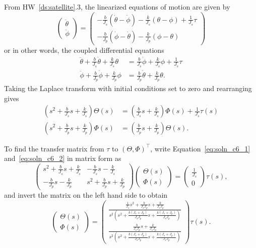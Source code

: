 
From HW~\ref{ds:satellite}.3, the linearized equations of motion are given by
\[
\begin{pmatrix}\ddot{\theta} \\ \ddot{\phi} \end{pmatrix} 
= \begin{pmatrix} -\frac{b}{J_s}(\dot{\theta}-\dot{\phi})-\frac{k}{J_s}(\theta-\phi)+\frac{1}{J_s}\tau \\ -\frac{b}{J_p}(\dot{\phi}-\dot{\theta}) -\frac{k}{J_p}(\phi-\theta) \end{pmatrix}
\]
or in other words, the coupled differential equations
\begin{align*}
\ddot{\theta} + \frac{b}{J_s}\dot{\theta} + \frac{k}{J_s}\theta  &= \frac{b}{J_s}\dot{\phi}+\frac{k}{J_s}\phi+\frac{1}{J_s}\tau \\
\ddot{\phi} + \frac{b}{J_p}\dot{\phi} +\frac{k}{J_p}\phi &= \frac{b}{J_p}\dot{\theta} + \frac{k}{J_p}\theta.
\end{align*}
Taking the Laplace transform with initial conditions set to zero and rearranging gives
\begin{align}
(s^2+\frac{b}{J_s}s+\frac{k}{J_s})\Theta(s)  &= (\frac{b}{J_s}s+\frac{k}{J_s})\Phi(s)+\frac{1}{J_s}\tau(s) 
\label{eq:soln_c6_1}\\
(s^2+\frac{b}{J_p}s+\frac{k}{J_p})\Phi(s) &= (\frac{b}{J_p}s+\frac{k}{J_p})\Theta(s).
\label{eq:soln_c6_2}
\end{align}

To find the transfer matrix from $\tau$ to $(\Theta, \Phi)^\top$, write Equation~\eqref{eq:soln_c6_1} and~\eqref{eq:soln_c6_2} in matrix form as
\[
\left(\begin{array}{c|c}
s^2+\frac{b}{J_s}s+\frac{k}{J_s} & -\frac{b}{J_s}s-\frac{k}{J_s} \\\hline 
-\frac{b}{J_p}s-\frac{k}{J_p} & s^2+\frac{b}{J_p}s+\frac{k}{J_p} \end{array}\right)
\begin{pmatrix}\Theta(s) \\ \Phi(s) \end{pmatrix} 
= \begin{pmatrix} \frac{1}{J_s} \\ 0 \end{pmatrix} \tau(s),
\]
and invert the matrix on the left hand side to obtain
\[
\begin{pmatrix}\Theta(s) \\ \Phi(s) \end{pmatrix} 
= \begin{pmatrix} 
\frac{\frac{1}{J_s}s^2+\frac{b}{J_sJ_p}s+\frac{k}{J_sJ_p}}{s^2\left( s^2+\frac{b(J_s+J_p)}{J_sJ_p}s+\frac{k(J_s+J_p)}{J_sJ_p} \right)}
\\ 
\frac{\frac{b}{J_sJ_p}s+\frac{k}{J_sJ_p}}{s^2\left( s^2+\frac{b(J_s+J_p)}{J_sJ_p}s+\frac{k(J_s+J_p)}{J_sJ_p} \right)}
\end{pmatrix} \tau(s).
\]

